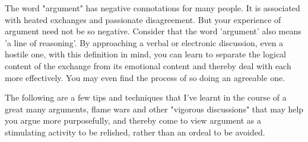 \documentclass{article}
\begin{document}
The word "argument" has negative connotations for many people. It is
associated with heated exchanges and passionate disagreement. But your
experience of argument need not be so negative. Consider that the word
'argument' also means 'a line of reasoning'. By approaching a verbal or
electronic discussion, even a hostile one, with this definition in mind,
you can learn to separate the logical content of the exchange from its
emotional content and thereby deal with each more effectively. You may
even find the process of so doing an agreeable one.

The following are a few tips and techniques that I've learnt in the
course of a great many arguments, flame wars and other "vigorous
discussions" that may help you argue more purposefully, and thereby come
to view argument as a stimulating activity to be relished, rather than
an ordeal to be avoided.
\end{document}
